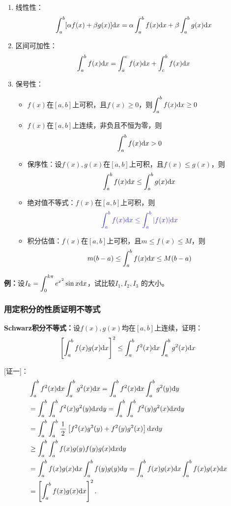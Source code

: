 \begin{thx}
	\begin{enumerate}[(1)]
	  \item {\kaishu 线性性：}
	  $$\displaystyle\int_a^b[\alpha
	  f(x)+\beta g(x)]\mathrm{d} x=\alpha\displaystyle\int_a^bf(x)\mathrm{d} x+\beta\displaystyle\int_a^bg(x)\mathrm{d} x$$
	  \item {\kaishu 区间可加性：}
	  $$\displaystyle\int_a^bf(x)\mathrm{d} x=\displaystyle\int_a^cf(x)\mathrm{d} x+\displaystyle\int_c^bf(x)\mathrm{d} x$$
	  \item {\kaishu 保号性：}%
	  \begin{itemize}
	    \item $f(x)$在$[a,b]$上可积，且$f(x)\geq 0$，则$\displaystyle\int_a^bf(x)\mathrm{d} x\geq 0$ 
	    \item $f(x)$在$[a,b]$上连续，非负且不恒为零，则$$\displaystyle\int_a^bf(x)\mathrm{d} x> 0$$ 
	    \item {\kaishu 保序性：}设$f(x),g(x)$在$[a,b]$上可积，且$f(x)\leq g(x)$，则
	    $$\displaystyle\int_a^bf(x)\mathrm{d} x\leq \displaystyle\int_a^bg(x)\mathrm{d} x$$
	    \item {\kaishu 绝对值不等式：}$f(x)$在$[a,b]$上可积，则
	    $${\b \dint_a^bf(x)\d x\leq\dint_a^b|f(x)|\d x}$$ 
	    \item {\kaishu 积分估值：}$f(x)$在$[a,b]$上可积，且$m\leq f(x)\leq M$，则
	    $$m(b-a)\leq\displaystyle\int_a^bf(x)\mathrm{d} x\leq M(b-a)$$
	  \end{itemize}
	\end{enumerate}
\end{thx}

{\bf 例：}设$I_k=\displaystyle\int_0^{k\pi}e^{x^2}\sin x\mathrm{d} x$，试比较$I_1,I_2,I_3$
的大小。

\subsubsection{用定积分的性质证明不等式}

\begin{thx}
	{\bf Schwarz积分不等式：}设$f(x),g(x)$均在$[a,b]$上连续，证明：
	$$\left[\displaystyle\int_a^bf(x)g(x)\mathrm{d} x\right]^2
	\leq\displaystyle\int_a^bf^2(x)\mathrm{d} x\displaystyle\int_a^bg^2(x)\mathrm{d} x$$
\end{thx}

[证一]：
\begin{align*}
	&\displaystyle\int_a^bf^2(x)\mathrm{d} x\displaystyle\int_a^bg^2(x)\mathrm{d} x
	=\displaystyle\int_a^bf^2(x)\mathrm{d} x\displaystyle\int_a^bg^2(y)\mathrm{d} y\\
	&=\displaystyle\int_a^b\displaystyle\int_a^bf^2(x)g^2(y)\mathrm{d} x\mathrm{d} y
	=\displaystyle\int_a^b\displaystyle\int_a^bf^2(y)g^2(x)\mathrm{d} x\mathrm{d} y\\
	&=\displaystyle\int_a^b\displaystyle\int_a^b\displaystyle\frac{\,{1}\,}{\,{2}\,}\left[f^2(x)g^2(y)
	+f^2(y)g^2(x)\right]\mathrm{d} x\mathrm{d} y\\
	&\geq \displaystyle\int_a^b\displaystyle\int_a^bf(x)g(y)
	f(y)g(x)\mathrm{d} x\mathrm{d} y\\
	&=\displaystyle\int_a^bf(x)g(x)\mathrm{d} x\displaystyle\int_a^bf(y)g(y)\mathrm{d} y
	=\displaystyle\int_a^bf(x)g(x)\mathrm{d} x\displaystyle\int_a^bf(x)g(x)\mathrm{d} x\\
	&=\left[\displaystyle\int_a^bf(x)g(x)\mathrm{d} x\right]^2.
\end{align*}
\fin

